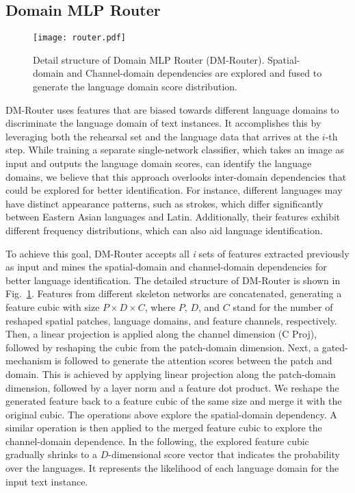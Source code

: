 \documentclass[10pt,twocolumn,letterpaper]{article}
\begin{document}
\subsection{Domain MLP Router}

\begin{figure}[]
\centering
\texttt{[image: router.pdf]} \caption{Detail structure of Domain MLP Router (DM-Router). Spatial-domain and Channel-domain dependencies are explored and fused to generate the language domain score distribution. }
\label{fig1:router}
\end{figure}

DM-Router uses features that are biased towards different language domains to discriminate the language domain of text instances. It accomplishes this by leveraging both the rehearsal set and the language data that arrives at the $i$-th step. While training a separate single-network classifier, which takes an image as input and outputs the language domain scores, can identify the language domains, we believe that this approach overlooks inter-domain dependencies that could be explored for better identification. For instance, different languages may have distinct appearance patterns, such as strokes, which differ significantly between Eastern Asian languages and Latin. Additionally, their features exhibit different frequency distributions, which can also aid language identification.


To achieve this goal, DM-Router accepts all \emph{i} sets of features extracted previously as input and mines the spatial-domain and channel-domain dependencies for better language identification. The detailed structure of DM-Router is shown in Fig.~\ref{fig1:router}. Features from different skeleton networks are concatenated, generating a feature cubic with size $P\times D \times C$, where $P$, $D$, and $C$ stand for the number of reshaped spatial patches, language domains, and feature channels, respectively. Then, a linear projection is applied along the channel dimension (C Proj), followed by reshaping the cubic from the patch-domain dimension. Next, a gated-mechanism is followed to generate the attention scores between the patch and domain. This is achieved by applying linear projection along the patch-domain dimension, followed by a layer norm and a feature dot product. We reshape the generated feature back to a feature cubic of the same size and merge it with the original cubic. The operations above explore the spatial-domain dependency. A similar operation is then applied to the merged feature cubic to explore the channel-domain dependence. In the following, the explored feature cubic gradually shrinks to a $D$-dimensional score vector that indicates the probability over the languages. It represents the likelihood of each language domain for the input text instance.   
\end{document}
